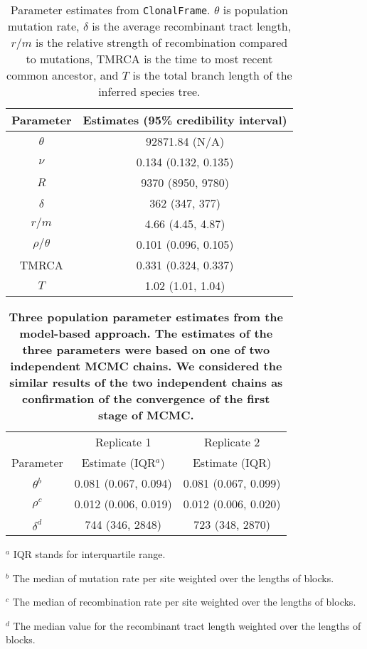 \documentclass[10pt]{article}
\providecommand{\tabularnewline}{\\}
\begin{document}
\begin{table}
\caption{\label{tab:clonalframe}Parameter estimates from \texttt{ClonalFrame}. 
$\theta$ is population mutation rate,
$\delta$ is the average recombinant tract length,
$r/m$ is the relative strength of recombination compared to mutations,
TMRCA is the time to most recent common ancestor, and
$T$ is the total branch length of the inferred species tree.}
\noindent \centering{}\begin{tabular}{cc}
\hline
Parameter & Estimates (95\% credibility interval) \tabularnewline
\hline
$\theta$ & 92871.84 (N/A)\tabularnewline
$\nu$ & 0.134 (0.132, 0.135)\tabularnewline
$R$ & 9370 (8950, 9780)\tabularnewline
$\delta$ & 362 (347, 377)\tabularnewline
$r/m$ & 4.66 (4.45, 4.87)\tabularnewline
$\rho/\theta$ & 0.101 (0.096, 0.105)\tabularnewline
TMRCA & 0.331 (0.324, 0.337)\tabularnewline
$T$ & 1.02 (1.01, 1.04)\tabularnewline
\hline
\end{tabular}
\end{table}

\begin{table}
\caption{\label{tab:three}
\bf{Three population parameter estimates from the model-based approach.}
The estimates of the three parameters were based on one of two independent
MCMC chains.  We considered the similar 
results of the two independent chains as confirmation of 
the convergence of the first stage of MCMC.}
\noindent \begin{centering}
\begin{tabular}{ccc}
\hline
& Replicate 1 & Replicate 2\tabularnewline
Parameter & Estimate (IQR$^a$) & Estimate (IQR)\tabularnewline
\hline
$\theta^b$ & 0.081 (0.067, 0.094) & 0.081 (0.067, 0.099)\tabularnewline
$\rho^c$ & 0.012 (0.006, 0.019) & 0.012 (0.006, 0.020)\tabularnewline
$\delta^d$ & 744 (346, 2848) & 723 (348, 2870)\tabularnewline
\hline
\end{tabular}
\par\end{centering}
\begin{flushleft}
$^a$ IQR stands for interquartile range.

$^b$ The median of mutation rate per site weighted over the lengths of blocks. 

$^c$ The median of recombination rate per site weighted over the lengths of blocks.

$^d$ The median value for the recombinant tract length weighted over the lengths of blocks.
\end{flushleft}

\end{table}
\end{document}
